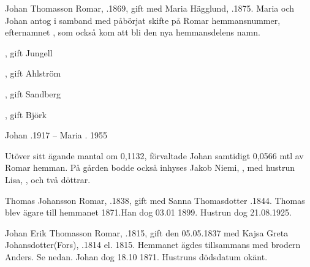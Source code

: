 
Johan Thomasson Romar, .1869, gift med Maria Hägglund, .1875. Maria och Johan antog i samband med påbörjat skifte på Romar hemmansnummer, efternamnet , som också kom att bli den nya hemmansdelens namn.
\begin{jhchildren}
  \item {}
  \item {}, gift Jungell
  \item {}, gift Ahlström
  \item {}, gift Sandberg
  \item {}
  \item {}, gift Björk
\end{jhchildren}

Johan .1917  --  Maria . 1955

Utöver sitt ägande mantal om 0,1132, förvaltade Johan samtidigt 0,0566 mtl av Romar hemman. På gården bodde också inhyses Jakob Niemi, , med hustrun Lisa, , och två döttrar.



Thomas Johansson Romar, .1838, gift med Sanna Thomasdotter .1844.
Thomas blev ägare till hemmanet 1871.Han dog 03.01 1899. Hustrun dog 21.08.1925.
\begin{jhchildren}
  \item {}
  \item {}
  \item {}
  \item {}
  \item {}
  \item {}
  \item {}
  \item {}
\end{jhchildren}



Johan Erik Thomasson Romar, .1815, gift den 05.05.1837 med Kajsa Greta Johansdotter(Fors), .1814 el. 1815.
Hemmanet ägdes tillsammans med brodern Anders. Se nedan. Johan dog 18.10 1871. Hustruns dödsdatum okänt.
\begin{jhchildren}
  \item {}
  \item {}
  \item {}
  \item {}
\end{jhchildren}



